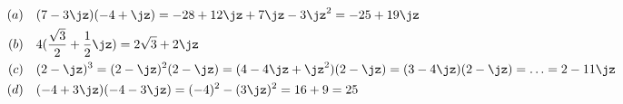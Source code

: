 \begin{align}
(a) \quad& (7-3\jz)(-4+\jz) = -28  + 12\jz + 7 \jz -3 \jz^2 = -25 + 19 \jz
\\
(b) \quad& 4(\frac{\sqrt{3}}{2} + \frac{1}{2} \jz) = 2 \sqrt{3} + 2 \jz
\\
(c) \quad& (2-\jz)^3 = (2-\jz)^2 (2-\jz) = (4 -4\jz + \jz^2) (2-\jz) = (3 -
4\jz)(2-\jz) = \ldots = 2 - 11 \jz \\
(d) \quad& (-4 + 3\jz)(-4-3\jz) = (-4)^2 - (3\jz)^2 = 16 + 9 = 25
\end{align}

